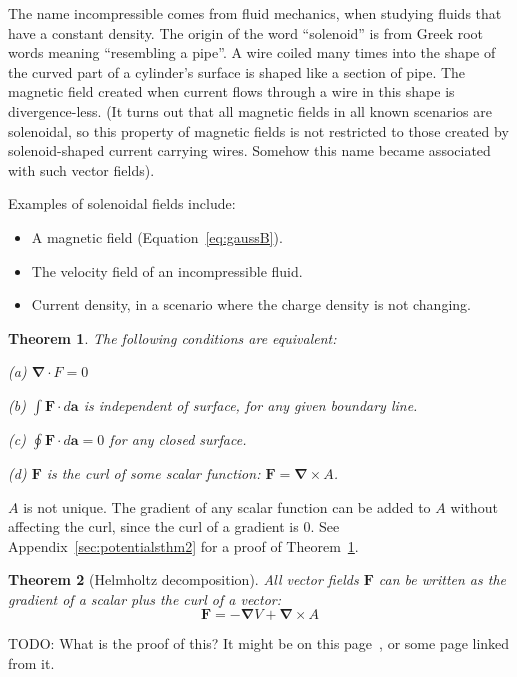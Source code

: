 \documentclass[a4paper]{article}
\theoremstyle{plain}
\newtheorem{theorem}{Theorem}
\theoremstyle{definition}
\newcommand{\vect}[1]{\textbf{#1}}
\newcommand{\del}{\bm{\nabla}}
\begin{document}
The name incompressible comes from fluid mechanics, when studying
fluids that have a constant density.
The origin of the word ``solenoid'' is from Greek root words meaning
``resembling a pipe''.  A wire coiled many times into the shape of the
curved part of a cylinder's surface is shaped like a section of pipe.
The magnetic field created when current flows through a wire in this
shape is divergence-less.  (It turns out that all magnetic fields in
all known scenarios are solenoidal, so this property of magnetic
fields is not restricted to those created by solenoid-shaped current
carrying wires.  Somehow this name became associated with such vector
fields).

Examples of solenoidal fields include:
\begin{itemize}
\item A magnetic field (Equation~\eqref{eq:gaussB}).
\item The velocity field of an incompressible fluid.
\item Current density, in a scenario where the charge density is not
  changing.
\end{itemize}

\begin{theorem}
\label{thm:solenoidalfieldproperties}
The following conditions are equivalent:

(a) $\del \cdot F = 0$

(b) $\int \vect{F} \cdot d\vect{a}$ is independent of surface, for any
given boundary line.

(c) $\oint \vect{F} \cdot d\vect{a} = 0$ for any closed surface.

(d) $\vect{F}$ is the curl of some scalar function:
$\vect{F} = \del \times A$.
\end{theorem}

$A$ is not unique.  The gradient of any scalar function can be added
to $A$ without affecting the curl, since the curl of a gradient is 0.
See Appendix~\ref{sec:potentialsthm2} for
a proof of Theorem~\ref{thm:solenoidalfieldproperties}.

\begin{theorem}[Helmholtz decomposition]
\label{thm:helmholtzdecomposition}
All vector fields $\vect{F}$ can be written as the gradient of a
scalar plus the curl of a vector:
\begin{equation}
\vect{F} = - \del V + \del \times A
\end{equation}
\end{theorem}
TODO: What is the proof of this?  It might be on this
page~\cite{WikipediaHelmholtzDecomposition}, or some page linked from
it.
\end{document}
